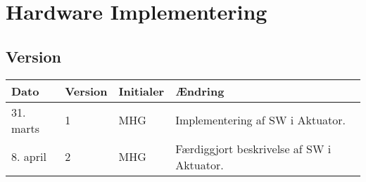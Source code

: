 \chapter{Hardware Implementering}

\section{Version}
\begin{table}[h]
	\centering
	\begin{tabularx}{\textwidth - 2cm}{|l|l|l|X|}
	\hline
	Dato	& Version	& Initialer & Ændring	\\ \hline
	31. marts & 1 & MHG & Implementering af SW i Aktuator. \\ \hline
	8. april & 2 & MHG & Færdiggjort beskrivelse af SW i Aktuator. \\\hline
	\end{tabularx}
\end{table}

